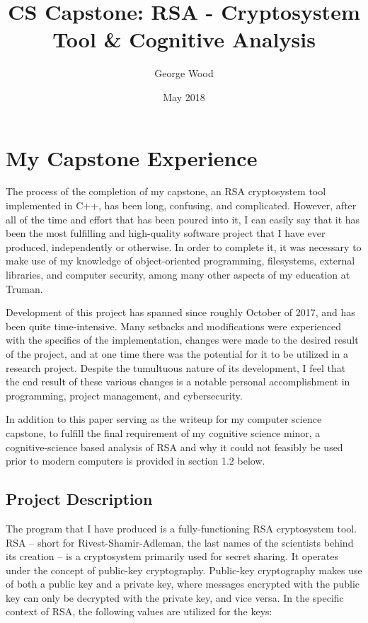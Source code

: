\documentclass[11pt]{article}
\title{CS Capstone: RSA - Cryptosystem Tool \& Cognitive Analysis }
\author{George Wood}
\date{May 2018}
\begin{document}
\maketitle

\thispagestyle{empty}

\section{My Capstone Experience}
The process of the completion of my capstone, an RSA cryptosystem tool implemented in C++, has been long, confusing, and complicated. However, after all of the time and effort that has been poured into it, I can easily say that it has been the most fulfilling and high-quality software project that I have ever produced, independently or otherwise. In order to complete it, it was necessary to make use of my knowledge of object-oriented programming, filesystems, external libraries, and computer security, among many other aspects of my education at Truman.

Development of this project has spanned since roughly October of 2017, and has been quite time-intensive. Many setbacks and modifications were experienced with the specifics of the implementation, changes were made to the desired result of the project, and at one time there was the potential for it to be utilized in a research project. Despite the tumultuous nature of its development, I feel that the end result of these various changes is a notable personal accomplishment in programming, project management, and cybersecurity.

In addition to this paper serving as the writeup for my computer science capstone, to fulfill the final requirement of my cognitive science minor, a cognitive-science based analysis of RSA and why it could not feasibly be used prior to modern computers is provided in section 1.2 below. 

\subsection{Project Description}
The program that I have produced is a fully-functioning RSA cryptosystem tool. RSA -- short for Rivest-Shamir-Adleman, the last names of the scientists behind its creation -- is a cryptosystem primarily used for secret sharing. It operates under the concept of public-key cryptography. Public-key cryptography makes use of both a public key and a private key, where messages encrypted with the public key can only be decrypted with the private key, and vice versa. In the specific context of RSA, the following values are utilized for the keys:
\end{document}

